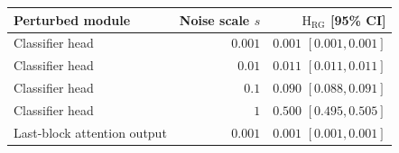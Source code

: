 \begin{tabular}{lrr}
\toprule
Perturbed module & Noise scale $s$ & $\mathrm{H}_{\mathrm{RG}}$ [95\% CI] \\
\midrule
Classifier head & $0.001$ & $0.001$ $[0.001,0.001]$ \\
Classifier head & $0.01$ & $0.011$ $[0.011,0.011]$ \\
Classifier head & $0.1$ & $0.090$ $[0.088,0.091]$ \\
Classifier head & $1$ & $0.500$ $[0.495,0.505]$ \\
Last-block attention output & $0.001$ & $0.001$ $[0.001,0.001]$ \\
\bottomrule
\end{tabular}
